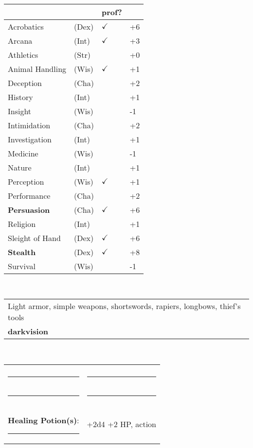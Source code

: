 \documentclass[twocolumn]{article}
\begin{document}
\\
\noindent\begin{tabular}{llll}
 & & prof? & \\
\hline
Acrobatics & (Dex) & $\checkmark$ &+6 \\
Arcana & (Int) & $\checkmark$ & +3 \\ 
Athletics & (Str) &  & +0\\
Animal Handling & (Wis) & $\checkmark$ & +1\\
Deception & (Cha) &  & +2\\
History & (Int) &  & +1 \\
Insight & (Wis) &  & -1 \\
Intimidation & (Cha) &  & +2 \\
Investigation & (Int) &  & +1 \\
Medicine & (Wis) &  & -1 \\
Nature & (Int) &  & +1 \\
Perception & (Wis) & $\checkmark$ & +1 \\
Performance & (Cha) &  & +2 \\
\textbf{Persuasion} & (Cha) & $\checkmark$ & +6 \\
Religion & (Int) &  & +1 \\
Sleight of Hand & (Dex) & $\checkmark$ & +6 \\
\textbf{Stealth} & (Dex) & $\checkmark$ & +8 \\
Survival & (Wis) &  & -1 \\
\hline
\end{tabular}
\vspace{12pt}

\\
\noindent\begin{tabular}{|m{3.1in}|}
\hline
Light armor, simple weapons, shortswords, rapiers, longbows, thief's tools \\
\textbf{darkvision} \\
\hline
\end{tabular}
\vspace{12pt}


\\
\noindent\begin{tabular}{|ll|}
\hline&\\
\rule{1.4in}{.2pt}&\rule{1.4in}{.2pt}\\
\rule{1.4in}{.2pt}&\rule{1.4in}{.2pt}\\
\textbf{Healing Potion(s)}: \rule{.2in}{.2pt}& +2d4 +2 HP, {\sc action}\\
\hline
\end{tabular}
\vspace{12pt}
\end{document}
